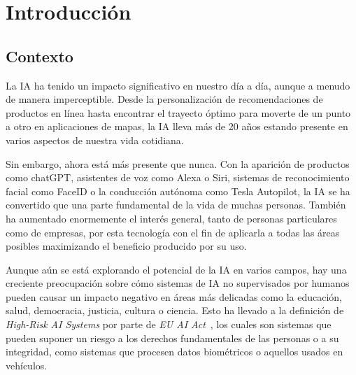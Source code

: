\chapter{Introducción}

\section{Contexto}

La \ac{IA} ha tenido un impacto significativo en nuestro día a día, aunque a menudo de manera imperceptible. Desde la personalización de recomendaciones de productos en línea hasta encontrar el trayecto óptimo para moverte de un punto a otro en aplicaciones de mapas, la \ac{IA} lleva más de 20 años estando presente en varios aspectos de nuestra vida cotidiana.

Sin embargo, ahora está más presente que nunca. Con la aparición de productos como chatGPT, asistentes de voz como Alexa o Siri, sistemas de reconocimiento facial como FaceID o la conducción autónoma como Tesla Autopilot, la \ac{IA} se ha convertido que una parte fundamental de la vida de muchas personas. También ha aumentado enormemente el interés general, tanto de personas particulares como de empresas, por esta tecnología con el fin de aplicarla a todas las áreas posibles maximizando el beneficio producido por su uso.


Aunque aún se está explorando el potencial de la \ac{IA} en varios campos, hay una creciente preocupación sobre cómo sistemas de \ac{IA} no supervisados por humanos pueden causar un impacto negativo en áreas más delicadas como la educación, salud, democracia, justicia, cultura o ciencia. Esto ha llevado a la definición de \textit{High-Risk AI Systems} por parte de \textit{EU AI Act}~\cite{euact}, los cuales son sistemas que pueden suponer un riesgo a los derechos fundamentales de las personas o a su integridad, como sistemas que procesen datos biométricos o aquellos usados en vehículos.

